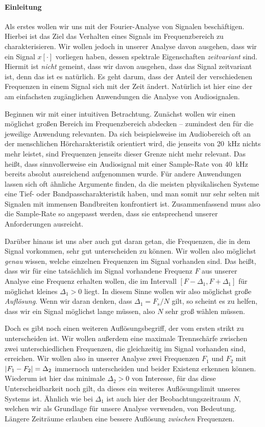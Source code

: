 \paragraph{Einleitung}\label{par:stft:intro}
%
Als erstes wollen wir uns mit der Fourier-Analyse von Signalen beschäftigen.
Hierbei ist das Ziel das Verhalten eines Signals im Frequenzbereich zu charakterisieren.
Wir wollen jedoch in unserer Analyse davon ausgehen, dass wir ein Signal $x[\cdot]$ vorliegen haben, dessen spektrale Eigenschaften \emph{zeitvariant} sind.
Hiermit ist \emph{nicht} gemeint, dass wir davon ausgehen, dass das Signal zeitvariant ist, denn das ist es natürlich.
Es geht darum, dass der Anteil der verschiedenen Frequenzen in einem Signal sich mit der Zeit ändert.
Natürlich ist hier eine der am einfachsten zugänglichen Anwendungen die Analyse von Audiosignalen.

Beginnen wir mit einer intuitiven Betrachtung.
Zunächst wollen wir einen möglichst großen Bereich im Frequenzbereich abdecken -- zumindest den für die jeweilige Anwendung relevanten.
Da sich beispielsweise im Audiobereich oft an der menschlichen Hörcharakteristik orientiert wird, die jenseits von \SI{20}{\kilo\hertz} nichts mehr leistet, sind Frequenzen jenseits dieser Grenze nicht mehr relevant.
Das heißt, dass sinnvollerweise ein Audiosignal mit einer Sample-Rate von \SI{40}{\kilo\hertz} bereits absolut ausreichend aufgenommen wurde.
Für andere Anwendungen lassen sich oft ähnliche Argumente finden, da die meisten physikalischen Systeme eine Tief- oder Bandpasscharakteristik  haben, und man somit nur sehr selten mit Signalen mit immensen Bandbreiten konfrontiert ist.
Zusammenfassend muss also die Sample-Rate so angepasst werden, dass sie entsprechend unserer Anforderungen ausreicht.

Darüber hinaus ist uns aber auch gut daran getan, die Frequenzen, die in dem Signal vorkommen, sehr gut unterscheiden zu können.
Wir wollen also möglichst \emph{genau} wissen, welche einzelnen Frequenzen im Signal vorhanden sind. 
Das heißt, dass wir für eine tatsächlich im Signal vorhandene Frequenz $F$ aus unserer Analyse eine Frequenz erhalten wollen, die im Intervall $[F-\Delta_1,F+\Delta_1]$ für möglichst kleines $\Delta_1 > 0$ liegt.
In diesem Sinne wollen wir also möglichst große \emph{Auflösung}.
Wenn wir daran denken, dass $\Delta_1 = F_s/N$ gilt, so scheint es zu helfen, dass wir ein Signal möglichst lange  müssen, also $N$ sehr groß wählen müssen.

Doch es gibt noch einen weiteren Auflösungsbegriff, der vom ersten strikt zu unterscheiden ist.
Wir wollen außerdem eine maximale Trennschärfe zwischen zwei unterschiedlichen Frequenzen, die gleichzeitig im Signal vorhanden sind, erreichen.
Wir wollen also in unserer Analyse zwei Frequenzen $F_1$ und $F_2$ mit ${\left| F_1 - F_2 \right|} = \Delta_2$ immernoch unterscheiden und beider Existenz erkennen können.
Wiederum ist hier das minimale $\Delta_2 > 0$ von Interesse, für das diese Unterscheidbarkeit noch gilt, da dieses ein weiteres Auflösungslimit unseres Systems ist.
Ähnlich wie bei $\Delta_1$ ist auch hier der Beobachtungszeitraum $N$, welchen wir als Grundlage für unsere Analyse verwenden, von Bedeutung. 
Längere Zeiträume erlauben eine bessere Auflösung \emph{zwischen} Frequenzen.

